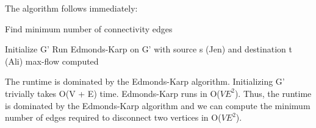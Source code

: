 \documentclass[11pt,a4paper]{article}
\begin{document}
The algorithm follows immediately:
\begin{algorithm}
\caption{Find minimum number of connectivity edges}
\begin{algorithmic}[1]
	\State Initialize G'
	\State Run Edmonds-Karp on G' with source s (Jen) and destination t (Ali)
	\State \Return max-flow computed

\EndFunction
\end{algorithmic}
\end{algorithm}

The runtime is dominated by the Edmonds-Karp algorithm. Initializing G' trivially takes O(V + E) time. Edmonds-Karp runs in O($VE^{2}$). Thus, the runtime is dominated by the Edmonds-Karp algorithm and we can compute the minimum number of edges required to disconnect two vertices in O($VE^{2}$).
\end{document}
